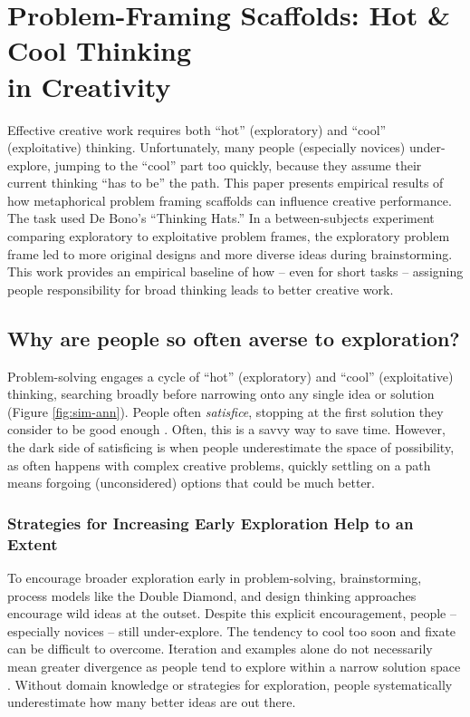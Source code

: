 \section{Problem-Framing Scaffolds: Hot \& Cool Thinking \\in Creativity}
\label{sec:hats_exp}
Effective creative work requires both ``hot'' (exploratory) and ``cool'' (exploitative) thinking. Unfortunately, many people (especially novices) under-explore, jumping to the ``cool'' part too quickly, because they assume their current thinking ``has to be'' the path.  This paper presents empirical results of how metaphorical problem framing scaffolds can influence creative performance. The task used De Bono's ``Thinking Hats.'' In a between-subjects experiment comparing exploratory to exploitative problem frames, the exploratory problem frame led to more original designs and more diverse ideas during brainstorming. This work provides an empirical baseline of how -- even for short tasks -- assigning people responsibility for broad thinking leads to better creative work.

\subsection{Why are people so often averse to exploration?}
Problem-solving engages a cycle of ``hot'' (exploratory) and ``cool'' (exploitative) thinking, searching broadly before narrowing onto any single idea or solution \cite{kirkpatrick1983optimization,lucas2014children}(Figure \ref{fig:sim-ann}). People often \textit{satisfice}, stopping at the first solution they consider to be good enough \cite{simon1972theories}. Often, this is a savvy way to save time. However, the dark side of satisficing is when people underestimate the space of possibility, as often happens with complex creative problems, quickly settling on a path means forgoing (unconsidered) options that could be much better.  

\subsubsection{Strategies for Increasing Early Exploration Help to an Extent}

To encourage broader exploration early in problem-solving, brainstorming, process models like the Double Diamond, and design thinking approaches encourage wild ideas at the outset. Despite this explicit encouragement, people -- especially novices -- still under-explore. The tendency to cool too soon and fixate can be difficult to overcome. Iteration and examples alone do not necessarily mean greater divergence as people tend to explore within a narrow solution space \cite{Dow2009, jansson1991design, kulkarni2012early}. Without domain knowledge or strategies for exploration, people systematically underestimate how many better ideas are out there. 

